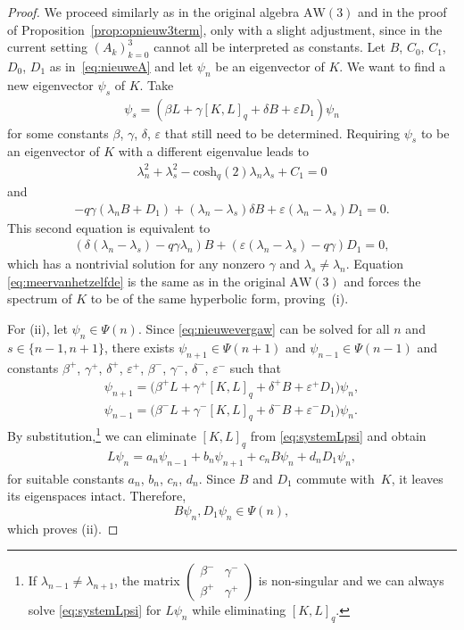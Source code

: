 \documentclass[10pt,a4paper]{amsart}
\numberwithin{equation}{section}
\newcommand{\aw}{\mathrm{AW}\!\left(3\right)}
\newcommand{\chq}{\mathrm{cosh}_q}
\newcommand{\ls}{\lambda_s}
\begin{document}
\begin{proof}
	We proceed similarly as in the original algebra $\aw$ and in the proof of Proposition~\ref{prop:opnieuw3term}, only with a slight adjustment, since in the current setting $(A_k)_{k=0}^3$ cannot all be interpreted as constants. Let $B$, $C_0$, $C_1$, $D_0$, $D_1$ as in~\eqref{eq:nieuweA} and let $\psi_n$ be an eigenvector of $K$. We want to find a new eigenvector $\psi_s$ of $K$. Take
	\begin{gather*}
		\psi_s = (\beta L + \gamma [K,L]_q + \delta B + \varepsilon D_1)\psi_n
	\end{gather*}
	for some constants $\beta$, $\gamma$, $\delta$, $\varepsilon$ that still need to be determined. Requiring $\psi_s$ to be an eigenvector of $K$ with a different eigenvalue leads to
	\begin{gather}
		\lambda_n^2+\ls^2-\chq(2)\lambda_n\ls +C_1=0\label{eq:meervanhetzelfde}
	\end{gather}
	and
	\begin{align}
		-q\gamma(\lambda_n B +D_1) + (\lambda_n-\lambda_s)\delta B +\varepsilon(\lambda_n-\lambda_s) D_1 =0.\nonumber
	\end{align}
	This second equation is equivalent to
	\begin{align}
		(\delta(\lambda_n-\lambda_s)-q\gamma\lambda_n)B + (\varepsilon(\lambda_n-\lambda_s)-q\gamma) D_1 =0, \label{eq:nieuwevergaw}
	\end{align}
	which has a nontrivial solution for any nonzero $\gamma$ and $\lambda_s\neq\lambda_n$. Equation \eqref{eq:meervanhetzelfde} is the same as in the original $\aw$ and forces the spectrum of $K$ to be of the same hyperbolic form, proving~(i).

For (ii), let $\psi_n\in\Psi(n)$. Since \eqref{eq:nieuwevergaw} can be solved for all $n$ and $s\in\{n-1,n+1\}$, there exists $\psi_{n+1}\in\Psi(n+1)$ and $\psi_{n-1}\in\Psi(n-1)$ and constants $\beta^+$, $\gamma^+$, $\delta^+$, $\varepsilon^+$, $\beta^-$, $\gamma^-$, $\delta^-$, $\varepsilon^-$ such that
	\begin{gather}
\psi_{n+1} =\big(\beta^+ L + \gamma^+ [K,L]_q + \delta^+ B + \varepsilon^+ D_1\big)\psi_n,\nonumber\\
			\psi_{n-1} =\big(\beta^-L + \gamma^- [K,L]_q + \delta^- B + \varepsilon^- D_1\big)\psi_n. \label{eq:systemLpsi}
	\end{gather}
	By substitution,\footnote{If $\lambda_{n-1}\neq\lambda_{n+1}$, the matrix $\left(\begin{smallmatrix}
			\beta^- & \gamma^- \\
			\beta^+ & \gamma^+
		\end{smallmatrix}\right)$ is non-singular and we can always solve \eqref{eq:systemLpsi} for $L\psi_n$ while eliminating $[K,L]_q$.}
	we can eliminate $[K,L]_q$ from \eqref{eq:systemLpsi} and obtain
	\begin{align*}
		L\psi_n = a_n \psi_{n-1} + b_n \psi_{n+1} + c_n B\psi_n + d_n D_1\psi_n,
	\end{align*}
	for suitable constants $a_n$, $b_n$, $c_n$, $d_n$. Since $B$ and $D_1$ commute with~$K$, it leaves its eigenspaces intact. Therefore,
	\[
	B\psi_n,D_1\psi_n \in \Psi(n),
	\]
	which proves (ii).
\end{proof}
\end{document}
